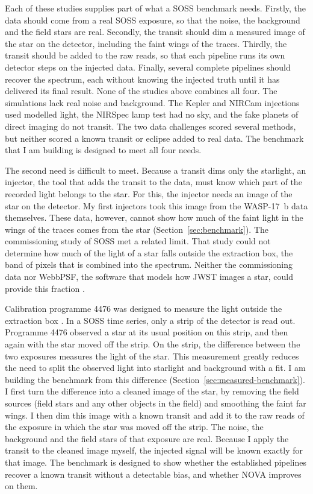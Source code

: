Each of these studies supplies part of what a SOSS benchmark needs. Firstly,
the data should come from a real SOSS exposure, so that the noise, the
background and the field stars are real. Secondly, the transit should dim a
measured image of the star on the detector, including the faint wings of the
traces. Thirdly, the transit should be added to the raw reads, so that each
pipeline runs its own detector steps on the injected data. Finally, several
complete pipelines should recover the spectrum, each without knowing the injected truth until it has delivered its final result. None of the
studies above combines all four. The simulations lack real noise and
background. The Kepler and NIRCam injections used modelled light, the NIRSpec
lamp test had no sky, and the fake planets of direct imaging do not transit.
The two data challenges scored several methods, but neither scored a known
transit or eclipse added to real data. The benchmark that I am building is
designed to meet all four needs.

The second need is difficult to meet. Because a transit dims only the starlight, an injector, the tool that adds the transit to the data, must know
which part of the recorded light belongs to the star. For this, the injector
needs an image of the star on the detector. My first injectors took this image
from the WASP-17~b data themselves. These data, however, cannot show how much
of the faint light in the wings of the traces comes from the star
(Section~\ref{sec:benchmark}). The commissioning study of SOSS met a related
limit. That study could not determine how much of the light of a star falls
outside the extraction box, the band of pixels that is combined into the spectrum. Neither the commissioning data nor WebbPSF, the software that models
how JWST images a star, could provide this fraction \citep{AlbertEtAl2023}.

Calibration programme 4476 was designed to measure the light outside the
extraction box \citep{VolkEspinoza2023}. In a SOSS time series, only a strip of the
detector is read out. Programme 4476 observed a star at its usual position on
this strip, and then again with the star moved off the strip. On the strip,
the difference between the two exposures measures the light of the star. This measurement greatly reduces the need to split the observed light into
starlight and background with a fit. I am building the benchmark from this difference (Section~\ref{sec:measured-benchmark}). I first turn the difference into a cleaned image of the star, by removing the field sources (field stars and any other objects in the field) and smoothing the faint far wings. I then dim this image with a known
transit and add it to the raw reads of the exposure in which the star was
moved off the strip. The noise, the background and the field stars of that
exposure are real. Because I apply the transit to the cleaned image
myself, the injected signal will be known exactly for that image. The
benchmark is designed to show whether the established pipelines recover a
known transit without a detectable bias, and whether NOVA improves on them.

